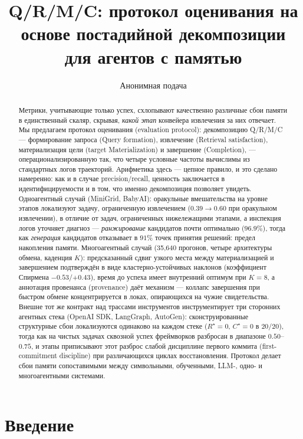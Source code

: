 \documentclass[letterpaper]{article} %
\title{Q/R/M/C: протокол оценивания на основе постадийной декомпозиции\\для агентов с памятью}
\author{Анонимная подача}
\begin{document}
\maketitle

\begin{abstract}
Метрики, учитывающие только успех, схлопывают качественно различные
сбои памяти в единственный скаляр, скрывая, \emph{какой этап}
конвейера извлечения за них отвечает. Мы предлагаем протокол
оценивания (evaluation protocol): декомпозицию Q/R/M/C ---
формирование запроса (Query formation), извлечение (Retrieval
satisfaction), материализация цели (target Materialization) и
завершение (Completion), --- операционализированную так, что четыре
условные частоты вычислимы из стандартных логов траекторий.
Арифметика здесь --- цепное правило, и это сделано намеренно: как и в
случае precision/recall, ценность заключается в идентифицируемости и
в том, что именно декомпозиция позволяет увидеть. Одноагентный случай
(MiniGrid, BabyAI): оракульные вмешательства на уровне этапов
локализуют задачу, ограниченную извлечением ($0.39\!\to\!0.60$ при
оракульном извлечении), в отличие от задач, ограниченных
нижележащими этапами, а инспекция логов уточняет диагноз ---
\emph{ранжирование} кандидатов почти оптимально ($96.9\%$), тогда как
\emph{генерация} кандидатов отказывает в $91\%$ точек принятия
решений: предел накопления памяти. Многоагентный случай (35{,}640
прогонов, четыре архитектуры обмена, каденция $K$): предсказанный
сдвиг узкого места между материализацией и завершением подтверждён в
виде кластерно-устойчивых наклонов (коэффициент Спирмена
$-0.53$/$+0.43$), время до успеха имеет внутренний оптимум при
$K{=}8$, а аннотация провенанса (provenance) даёт механизм --- коллапс
завершения при быстром обмене концентрируется в локах, опирающихся на
чужие свидетельства. Внешне тот же контракт над трассами инструментов
инструментирует три сторонних агентных стека (OpenAI SDK, LangGraph,
AutoGen): сконструированные структурные сбои локализуются одинаково
на каждом стеке ($R^\star{=}0$, $C^\star{=}0$ в $20/20$), тогда как
на чистых задачах сквозной успех фреймворков разбросан в диапазоне
$0.50$--$0.75$, и этапы приписывают этот разброс слабой дисциплине
первого коммита (first-commitment discipline) при различающихся
циклах восстановления. Протокол делает сбои памяти сопоставимыми
между символьными, обученными, LLM-, одно- и многоагентными
системами.
\end{abstract}

\section{Введение}
\end{document}
